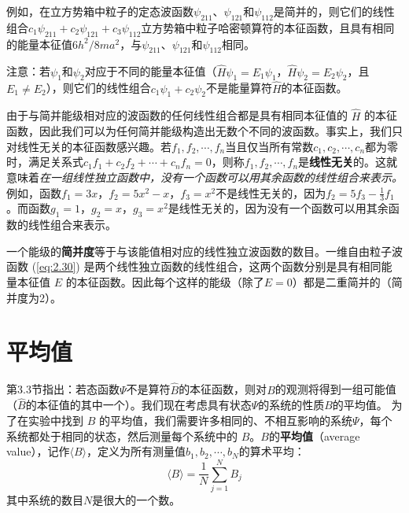 	例如，在立方势箱中粒子的定态波函数$\psi_{211}$、$\psi_{121}$和$\psi_{112}$是简并的，则它们的线性组合$c_1\psi_{211} + c_2\psi_{121} + c_3\psi_{112}$立方势箱中粒子哈密顿算符的本征函数，且具有相同的能量本征值$6h^2/8ma^2$，与$\psi_{211}$、$\psi_{121}$和$\psi_{112}$相同。

	 注意：若$\psi_1$和$\psi_2$对应于不同的能量本征值（$\hat{H}\psi_1 = E_1\psi_1$，$\hat{H}\psi_2 = E_2\psi_2$，且$E_1 \neq E_2$），则它们的线性组合$c_1\psi_1+c_2\psi_2$不是能量算符$\hat{H}$的本征函数。

	由于与简并能级相对应的波函数的任何线性组合都是具有相同本征值的 $\hat{H}$ 的本征函数，因此我们可以为任何简并能级构造出无数个不同的波函数。事实上，我们只对线性无关的本征函数感兴趣。若$f_1,f_2,\cdots,f_n$当且仅当所有常数$c_1,c_2,\cdots,c_n$都为零时，满足关系式$c_1f_1+c_2f_2+\cdots+c_nf_n=0$，则称$f_1,f_2,\cdots,f_n$是\textbf{线性无关}的。这就意味着\textit{在一组线性独立函数中，没有一个函数可以用其余函数的线性组合来表示。}例如，函数$f_1=3x$，$f_2=5x^2-x$，$f_3=x^2$不是线性无关的，因为$f_2=5f_3-\frac{1}{3}f_1$。而函数$g_1=1$，$g_2=x$，$g_3=x^2$是线性无关的，因为没有一个函数可以用其余函数的线性组合来表示。

	 一个能级的\textbf{简并度}等于与该能值相对应的线性独立波函数的数目。一维自由粒子波函数 (\ref{eq:2.30}) 是两个线性独立函数的线性组合，这两个函数分别是具有相同能量本征值 $E$ 的本征函数。因此每个这样的能级（除了$E=0$）都是二重简并的（简并度为2）。

\section{平均值}
\label{sec:3.7 Average Values}
	第3.3节指出：若态函数$\Psi$不是算符$\hat{B}$的本征函数，则对$B$的观测将得到一组可能值（$\hat{B}$的本征值的其中一个）。我们现在考虑具有状态$\Psi$的系统的性质$B$的平均值。
	为了在实验中找到 $B$ 的平均值，我们需要许多相同的、不相互影响的系统$\Psi$，每个系统都处于相同的状态，然后测量每个系统中的 $B$。$B$的\textbf{平均值}（average value），记作$\langle B \rangle$，定义为所有测量值$b_1,b_2,\cdots,b_N$的算术平均：
	\begin{equation}
		\langle B \rangle = \frac{1}{N}\sum_{j=1}^{N}B_j
		\label{eq:3.79}
	\end{equation}
	其中系统的数目$N$是很大的一个数。

